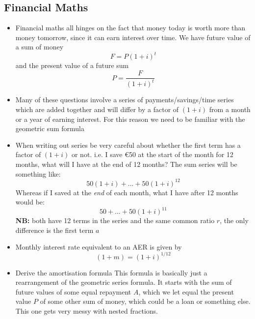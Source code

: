 \documentclass[10pt,a4paper]{article}
\newcommand{\NB}[1]{\textcolor{blumb}{\textbf{NB: }}}
\begin{document}
\subsection{Financial Maths}
    \begin{itemize}
        \item Financial maths all hinges on the fact that money today is worth more than money tomorrow, since it can earn interest over time. We have future value of a sum of money
            \begin{equation}
                F=P(1+i)^t
            \end{equation}
            and the present value of a future sum
            \begin{equation}
                P=\frac{F}{(1+i)^t}
            \end{equation}
            \item Many of these questions involve a series of payments/savings/time series which are added together and will differ by a factor of $(1+i)$ from a month or a year of earning interest. For this reason we need to be familiar with the geometric sum formula
            \item When writing out series be very careful about whether the first term has a factor of $(1+i)$ or not. i.e. I save €50 at the start of the month for 12 months, what will I have at the end of 12 months? The sum series will be something like:
            \begin{equation}
                50(1+i)+...+50(1+i)^{12}
            \end{equation}
            Whereas if I saved at the \textit{end} of each month, what I have after 12 months would be:
            \begin{equation}
                50+...+50(1+i)^{11}
            \end{equation}
            \NB{} both have 12 terms in the series and the same common ratio $r$, the only difference is the first term $a$
        \item Monthly interest rate equivalent to an AER is given by
        \begin{equation}
            (1+m)=(1+i)^{1/12}
        \end{equation}
        \item \textcolor{gren2}{Derive} the amortisation formula
        This formula is basically just a rearrangement of the geometric series formula. It starts with the sum of future values of some equal repayment $A$, which we let equal the present value $P$ of some other sum of money, which could be a loan or something else. This one gets very messy with nested fractions.

\end{itemize}
\end{document}
